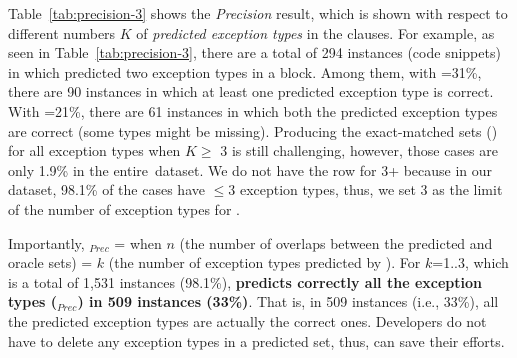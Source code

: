 Table~\ref{tab:precision-3} shows the {\em Precision} result, which is
shown with respect to different numbers $K$ of {\em predicted
  exception types} in the  clauses. For example, as seen
in Table~\ref{tab:precision-3}, there are a total of 294 instances
(code snippets) in which {\tool} predicted two exception types in a
 block. Among them, with =31\%, there are
90 instances in which at least one predicted exception type is
correct. With =21\%, there are 61 instances in which both
the predicted exception types are correct (some types might be
missing).
Producing the exact-matched sets () for all exception
types when $K \ge$ 3 is still challenging, however, those cases are
only 1.9\% in the entire~dataset. We do not have the row for 3+
because in our dataset, 98.1\% of the cases have $\leq$3 exception
types, thus, we set 3 as the limit of the number of exception types for {\xtype}.

Importantly, $_{Prec}$ =  when
$n$ (the number of overlaps between the predicted and oracle sets) =
$k$ (the number of exception types predicted by {\tool}).
For $k$=1..3, which is a total of 1,531 instances (98.1\%), {\bf
  {\tool} predicts correctly all the exception types
  ($_{Prec}$) in 509 instances (33\%)}. That is, in
509 instances (i.e., 33\%), all the predicted exception types are
actually the correct ones. Developers do not have to delete any
exception types in a predicted set, thus, {\tool} can save their efforts.




